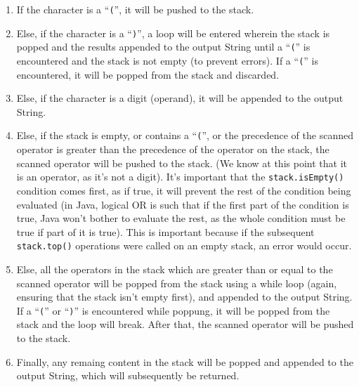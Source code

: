 \documentclass[a4paper]{article}
\begin{document}
\begin{enumerate}
    \item   If the character is a ``\verb|(|'', it will be pushed to the stack. 
    \item   Else, if the character is a ``\verb|)|'', a loop will be entered wherein the stack is popped and the results appended 
            to the output String until a ``\verb|(|'' is encountered and the stack is not empty (to prevent errors). 
            If a ``\verb|(|'' is encountered, it will be popped from the stack and discarded. 
    \item   Else, if the character is a digit (operand), it will be appended to the output String.
    \item   Else, if the stack is empty, or contains a ``\verb|(|'', or the precedence of the scanned operator is greater than 
            the precedence of the operator on the stack, the scanned operator will be pushed to the stack. (We know at this point 
            that it is an operator, as it's not a digit). 
            It's important that the \verb|stack.isEmpty()| condition comes first, as if true, it will prevent the rest of the 
            condition being evaluated (in Java, logical OR is such that if the first part of the condition is true, Java won't bother 
            to evaluate the rest, as the whole condition must be true if part of it is true).
            This is important because if the subsequent \verb|stack.top()| operations were called on an empty stack, an error 
            would occur.
    \item   Else, all the operators in the stack which are greater than or equal to the scanned operator will be popped from 
            the stack using a while loop (again, ensuring that the stack isn't empty first), and appended to the output String.
            If a ``\verb|(|'' or ``\verb|)|'' is encountered while poppung, it will be popped from the stack and the loop will break. 
            After that, the scanned operator will be pushed to the stack.  
    \item   Finally, any remaing content in the stack will be popped and appended to the output String, which will subsequently 
            be returned.
\end{enumerate}
\end{document}
